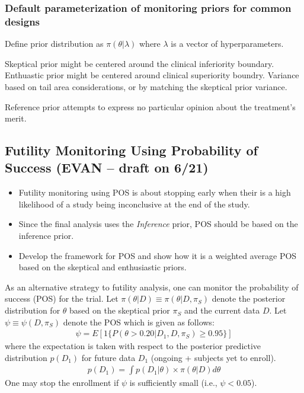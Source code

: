 \documentclass[12pt]{article}
\begin{document}
\subsubsection{Default parameterization of monitoring priors for common designs}\label{monitoring_prior_specification}
Define prior distribution as $\pi(\theta|\lambda)$ where $\lambda$ is a vector of hyperparameters.

Skeptical prior might be centered around the clinical inferiority boundary.
Enthuastic prior might be centered around clinical superiority boundry.
Variance based on tail area considerations, or by matching the skeptical prior variance.

Reference prior attempts to express no particular opinion about the treatment's merit. 



\subsection{Futility Monitoring Using Probability of Success (EVAN -- draft on 6/21)}

\begin{itemize}
 \item Futility monitoring using POS is about stopping early when their is a high likelihood
       of a study being inconclusive at the end of the study.
 \item Since the final analysis uses the \textit{Inference} prior, POS should be based on the
       inference prior.
 \item Develop the framework for POS and show how it is a weighted average POS based on the skeptical
       and enthusiastic priors.
\end{itemize}
As an alternative strategy to futility analysis, one can monitor the probability of success (POS) for the trial. Let $\pi(\theta|D)\equiv \pi(\theta|D, \pi_{S})$ denote the posterior distribution for $\theta$ based on the skeptical prior $ \pi_{S}$ and the current data $D$. Let $\psi\equiv\psi(D, \pi_{S})$ denote the POS which is given as follows:
\begin{align*}
\psi=E[1\{P(\theta>0.20|D_1,D, \pi_{S})\geq 0.95\}]
\end{align*}
where the expectation is taken with respect to the posterior predictive distribution $p(D_1)$ for future data $D_1$ (ongoing + subjects yet to enroll).
\begin{align*}
p(D_1)=\int p(D_1|\theta)\times \pi(\theta|D)d\theta
\end{align*}
One may stop the enrollment if $\psi$ is sufficiently small (i.e., $\psi<0.05$).
\end{document}
